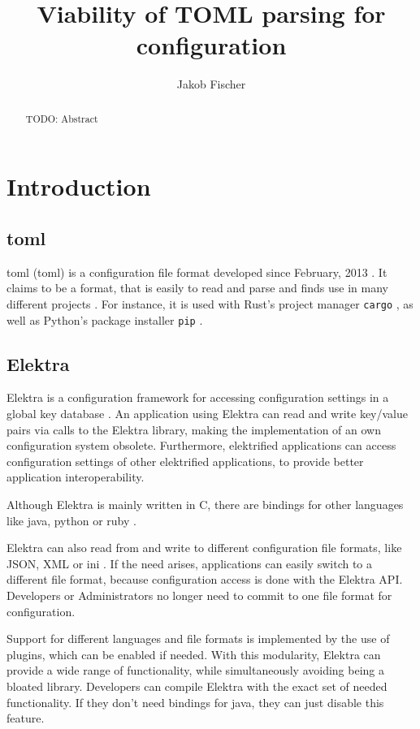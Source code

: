 \documentclass[12pt]{report}
\title{Viability of TOML parsing for configuration}
\author{Jakob Fischer}
\begin{document}
\maketitle

\begin{abstract}
TODO: Abstract
\end{abstract}

\chapter{Introduction}


\section{\acrshort{toml}}
\acrlong{toml} (\acrshort{toml}) is a configuration file format developed since February, 2013 \cite{tomlcontrib}.
It claims to be a format, that is easily to read and parse \cite{tomlreadme} and finds use in many different projects \cite{tomlwiki}.
For instance, it is used with Rust's project manager \texttt{cargo} \cite{cargogit}, as well as Python's package installer \texttt{pip} \cite{piprefguide}.

\section{Elektra}
Elektra is a configuration framework for accessing configuration settings in a global key database \cite{Elektramain}.
An application using Elektra can read and write key/value pairs via calls to the Elektra library, making the implementation of an own configuration system obsolete.
Furthermore, elektrified applications can access configuration settings of other elektrified applications, to provide better application interoperability.

Although Elektra is mainly written in C, there are bindings for other languages like java, python or ruby \cite{Elektrabindings}.

Elektra can also read from and write to different configuration file formats, like JSON, XML or ini \cite{Elektrastorage}.
If the need arises, applications can easily switch to a different file format, because configuration access is done with the Elektra API.
Developers or Administrators no longer need to commit to one file format for configuration.

Support for different languages and file formats is implemented by the use of plugins, which can be enabled if needed.
With this modularity, Elektra can provide a wide range of functionality, while simultaneously avoiding being a bloated library.
Developers can compile Elektra with the exact set of needed functionality. If they don't need bindings for java, they can just disable this feature.
\end{document}
